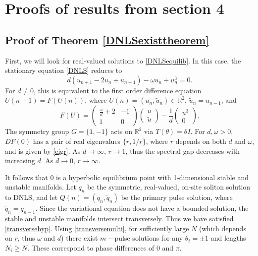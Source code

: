 \documentclass[12pt]{elsarticle}
\def\R{{\mathbb R}}
\begin{document}
\section{Proofs of results from section 4}

\subsection{Proof of Theorem \ref{DNLSexisttheorem}}

First, we will look for real-valued solutions to \cref{DNLSequilib}. In this case, the stationary equation \cref{DNLS} reduces to
\begin{equation*}
d(u_{n+1} - 2 u_n + u_{n-1}) - \omega u_n + u_n^3 = 0.
\end{equation*}
For $d \neq 0$, this is equivalent to the first order difference equation $U(n+1) = F(U(n))$, where $U(n) = (u_n, \tilde{u}_n) \in \R^2$, $\tilde{u}_n = u_{n-1}$, and 
\begin{equation}\label{dnlsdiffR2}
F(U) = 
\begin{pmatrix}
\frac{\omega}{d} + 2 & -1 \\
1 & 0
\end{pmatrix}
\begin{pmatrix}
u \\ \tilde{u}
\end{pmatrix}
- \frac{1}{d} 
\begin{pmatrix}
u^3 \\ 0
\end{pmatrix}.
\end{equation}
The symmetry group $G = \{ 1, -1\}$ acts on $\R^2$ via $T(\theta) = \theta I$. For $d, \omega > 0$, $DF(0)$ has a pair of real eigenvalues $\{r, 1/r \}$, where $r$ depends on both $d$ and $\omega$, and is given by \cref{eigr}. As $d \rightarrow \infty$, $r \rightarrow 1$, thus the spectral gap decreases with increasing $d$. As $d \rightarrow 0$, $r \rightarrow \infty$.

It follows that 0 is a hyperbolic equilibrium point with 1-dimensional stable and unstable manifolds. Let $q_n$ be the symmetric, real-valued, on-site soliton solution to DNLS, and let $Q(n) = (q_n, \tilde{q}_n)$ be the primary pulse solution, where $\tilde{q}_n = q_{n-1}$. Since the variational equation does not have a bounded solution, the stable and unstable manifolds intersect transversely. Thus we have satisfied \cref{transversehyp}. Using \cref{transversemulti}, for sufficiently large $N$ (which depends on $r$, thus $\omega$ and $d$) there exist $m-$pulse solutions for any $\theta_i = \pm 1$ and lengths $N_i \geq N$. These correspond to phase differences of $0$ and $\pi$.
\end{document}
